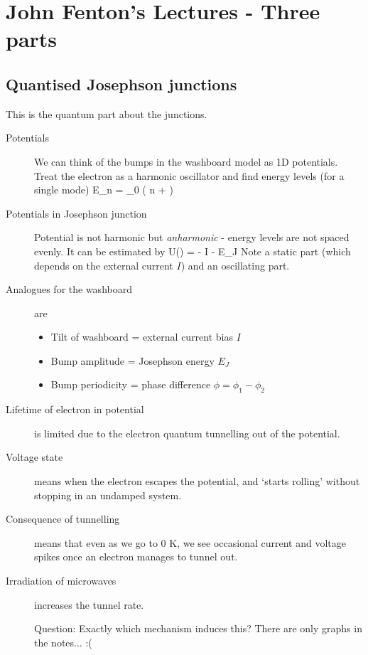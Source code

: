 \section{John Fenton's Lectures - Three parts}
\subsection{Quantised Josephson junctions}
This is the quantum part about the junctions. 

\begin{description}
\item[Potentials] We can think of the bumps in the washboard model as 1D potentials. Treat the electron as a harmonic oscillator and find energy levels (for a single mode)
\beq
E_n = \hbar \omega_0 \left(  n +  \right)
\eeq

\item[Potentials in Josephson junction] Potential is not harmonic but \emph{anharmonic} - energy levels are not spaced evenly. It can be estimated by 
\beq
U(\phi) = -  I \phi - E_J \cos{\phi}
\eeq
Note a static part (which depends on the external current $I$) and an oscillating part. 

\item[Analogues for the washboard] are
\begin{itemize}
\item Tilt of washboard = external current bias $I$
\item Bump amplitude = Josephson energy $E_J$
\item Bump periodicity = phase difference $\phi = \phi_1 - \phi_2$
\end{itemize}

\item[Lifetime of electron in potential] is limited due to the electron quantum tunnelling out of the potential. 

\item[Voltage state] means when the electron escapes the potential, and `starts rolling' without stopping in an undamped system. 

\item[Consequence of tunnelling] means that even as we go to 0 K, we see occasional current and voltage spikes once an electron manages to tunnel out. 

\item[Irradiation of microwaves] increases the tunnel rate. 

Question: Exactly which mechanism induces this? There are only graphs in the notes... :(


\end{description}
